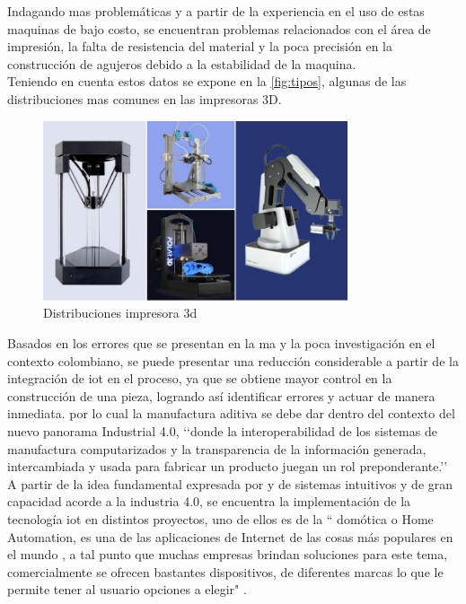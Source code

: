 Indagando mas problemáticas y a partir de la experiencia en el uso de estas maquinas de bajo costo, se encuentran problemas relacionados con el área de impresión, la falta de resistencia del material y la poca precisión en la construcción de agujeros debido a la estabilidad de la maquina.\\

Teniendo en cuenta estos datos se expone en la \autoref{fig:tipos}, algunas de las distribuciones mas comunes en las impresoras 3D.\\

\begin{figure}[H]
    \centering
    \includegraphics[width=0.8\textwidth]{Figs/tipos.PNG}
    \caption{Distribuciones impresora 3d \citep{} }
     \label{fig:tipos}
\end{figure}


Basados en los errores que se presentan en la \acrshort{ma} y la poca investigación en el contexto colombiano, se puede presentar una reducción considerable a partir de la integración de \acrshort{iot} en el proceso, ya que se obtiene mayor control en la construcción de una pieza, logrando así identificar errores y actuar de manera inmediata. por lo cual la manufactura aditiva se debe dar dentro del contexto del nuevo panorama Industrial 4.0, ‘‘donde la interoperabilidad de los sistemas de manufactura computarizados y la transparencia de la información generada, intercambiada y usada para fabricar un producto juegan un rol preponderante.’’ \citep{rodriguez} \\


A partir de la idea fundamental expresada por \citep{rodriguez} y \citep{muller} de sistemas intuitivos y de gran capacidad acorde a la industria 4.0, se encuentra la implementación de la tecnología \acrshort{iot} en distintos proyectos, uno de ellos es de la “ domótica o Home Automation, es una de las aplicaciones de Internet de las cosas más populares en el mundo , a tal punto que muchas empresas brindan soluciones para este tema, comercialmente se ofrecen bastantes dispositivos, de diferentes marcas lo que le permite tener al usuario opciones a elegir" \citep{tinoco}.\\

